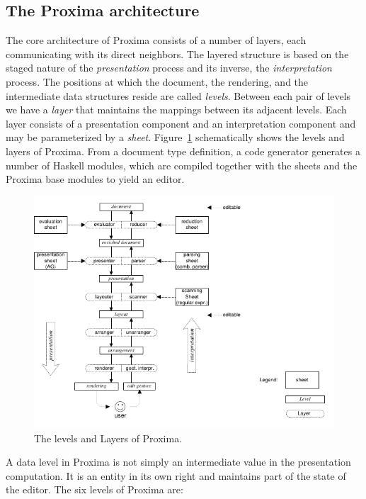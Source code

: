 \documentclass[10pt]{article}
\begin{document}
\subsection{The Proxima architecture}

The core architecture of Proxima consists of a number of layers, each communicating with its direct neighbors. The layered structure is based on the staged nature of the {\em presentation} process and its inverse, the {\em interpretation} process. The positions at which the document, the rendering, and the intermediate data structures reside are called {\em levels}. Between each pair of levels we have a {\em layer} that maintains the mappings between its adjacent levels. Each layer consists of a presentation component and an interpretation component and may be parameterized by a {\em sheet}. Figure~\ref{fig:levelsAndLayers} schematically shows the levels and layers of Proxima. From a document type definition, a code generator generates a number of Haskell modules, which are compiled together with the sheets and the Proxima base modules to yield an editor. 

\begin{figure}
\begin{center}
\includegraphics[width=12cm]{images/LayerOverview}
\end{center}
\caption{The levels and Layers of Proxima.}
\label{fig:levelsAndLayers}
\end{figure}

A data level in Proxima is not simply an intermediate value in the presentation computation. It is an entity in its own right and maintains part of the state of the editor. The six levels of Proxima are:
\end{document}
